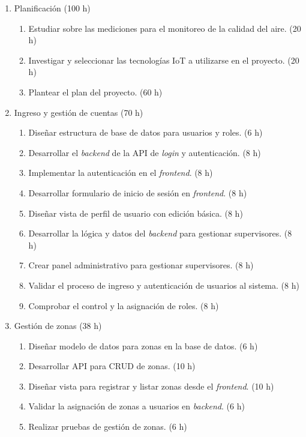 \documentclass[
11pt, %
]{charter}
\begin{document}
\begin{enumerate}
	\item Planificación (100 h)
	\begin{enumerate}
		\item Estudiar sobre las mediciones para el monitoreo de la calidad del aire. (20 h)
		\item Investigar y seleccionar las tecnologías IoT a utilizarse en el proyecto. (20 h)
		\item Plantear el plan del proyecto. (60 h)
	\end{enumerate}

    \item Ingreso y gestión de cuentas (70 h)
    \begin{enumerate}
        \item Diseñar estructura de base de datos para usuarios y roles. (6 h)
        \item Desarrollar el \textit{backend} de la API de \textit{login} y autenticación. (8 h)
        \item Implementar la autenticación en el \textit{frontend}. (8 h)
        \item Desarrollar formulario de inicio de sesión en \textit{frontend}. (8 h)
        \item Diseñar vista de perfil de usuario con edición básica. (8 h)
        \item Desarrollar la lógica y datos del \textit{backend} para gestionar supervisores. (8 h)
        \item Crear panel administrativo para gestionar supervisores. (8 h)
        \item Validar el proceso de ingreso y autenticación de usuarios al sistema. (8 h)
        \item Comprobar el control y la asignación de roles. (8 h)
    \end{enumerate}

    \item Gestión de zonas (38 h)
    \begin{enumerate}
        \item Diseñar modelo de datos para zonas en la base de datos. (6 h)
        \item Desarrollar API para CRUD de zonas. (10 h)
        \item Diseñar vista para registrar y listar zonas desde el \textit{frontend}. (10 h)
        \item Validar la asignación de zonas a usuarios en \textit{backend}. (6 h)
        \item Realizar pruebas de gestión de zonas. (6 h)
    \end{enumerate}


\end{enumerate}
\end{document}
